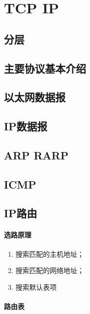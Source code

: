 \chapter{TCP IP}


\section{分层}


\section{主要协议基本介绍}


\section{以太网数据报}

\section{IP数据报}


\section{ARP RARP}

\section{ICMP}


\section{IP路由}

\subsubsection{选路原理}
\begin{enumerate}
\item 搜索匹配的主机地址；
\item 搜索匹配的网络地址；
\item 搜索默认表项
\end{enumerate}
\subsubsection{路由表}


